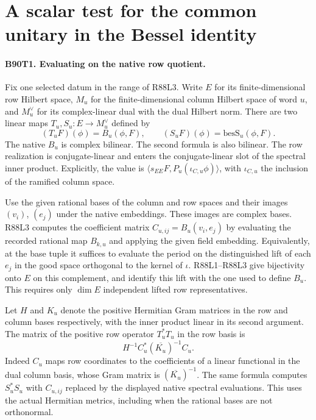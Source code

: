 \section{A scalar test for the common unitary in the Bessel identity}

\paragraph{B90T1. Evaluating on the native row quotient.}
Fix one selected datum in the range of R88L3. Write $E$ for its
finite-dimensional row Hilbert space, $M_u$ for the finite-dimensional
column Hilbert space of word $u$, and $M_u^\vee$ for its complex-linear
dual with the dual Hilbert norm. There are two linear maps
$T_u,S_u:E\longrightarrow M_u^\vee$ defined by
\[
 (T_uF)(\phi)=B_u(\phi,F),\qquad
 (S_uF)(\phi)=\mathrm{besS}_u(\phi,F).
\]
The native $B_u$ is complex bilinear. The second formula is also
bilinear. The row realization is conjugate-linear and enters the
conjugate-linear slot of the spectral inner product. Explicitly,
the value is $\langle s_{EE}F,P_u(\iota_{C,u}\phi)\rangle$,
with $\iota_{C,u}$ the inclusion of the ramified column space.

Use the given rational bases of the column and row spaces and their
images $(v_i)$, $(e_j)$ under the native embeddings. These images
are complex bases. R88L3 computes the coefficient matrix
$C_{u,ij}=B_u(v_i,e_j)$ by evaluating the recorded rational map
$B_{k,u}$ and applying the given field embedding. Equivalently, at
the base tuple it suffices to evaluate the period on the distinguished
lift of each $e_j$ in the good space orthogonal to the kernel of
$\iota$. R88L1--R88L3 give bijectivity onto $E$ on this complement,
and identify this lift with the one used to define $B_u$. This
requires only $\dim E$ independent lifted row representatives.

Let $H$ and $K_u$ denote the positive Hermitian Gram matrices in the
row and column bases respectively, with the inner product linear in its
second argument. The matrix of the positive row operator $T_u^*T_u$
in the row basis is
\[
                H^{-1}C_u^*(\overline{K_u})^{-1}C_u .
\]
Indeed $C_u$ maps row coordinates to the coefficients of a linear
functional in the dual column basis, whose Gram matrix is
$(\overline{K_u})^{-1}$. The same formula computes $S_u^*S_u$ with
$C_{u,ij}$ replaced by the displayed native spectral evaluations.
This uses the actual Hermitian metrics, including when the rational
bases are not orthonormal.

